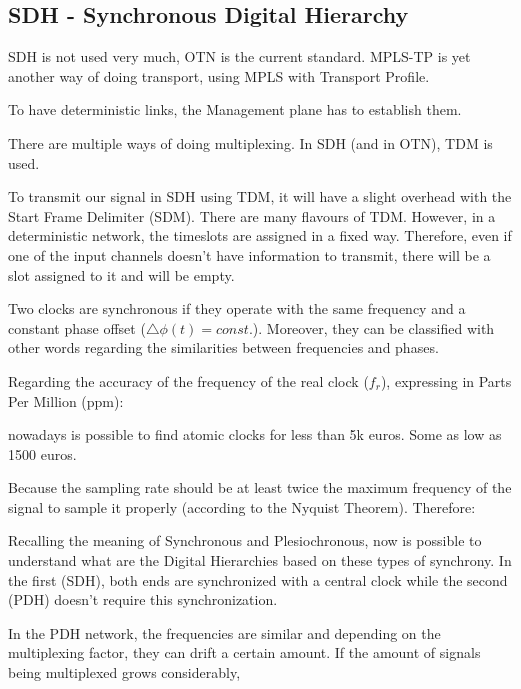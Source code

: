 \subsection{SDH - Synchronous Digital Hierarchy}


SDH is not used very much, OTN is the current standard. MPLS-TP is yet another way of doing transport, using MPLS with Transport Profile.

To have deterministic links, the Management plane has to establish them.

There are multiple ways of doing multiplexing. In SDH (and in OTN), TDM is used.

To transmit our signal in SDH using TDM, it will have a slight overhead with the Start Frame Delimiter (SDM). There are many flavours of TDM. However, in a deterministic network, the timeslots are assigned in a fixed way. Therefore, even if one of the input channels doesn't have information to transmit, there will be a slot assigned to it and will be empty.


Two clocks are synchronous if they operate with the same frequency
and a constant phase offset ($\bigtriangleup \phi(t) = const.$). Moreover, they can be classified with other words regarding the similarities between frequencies and phases.

Regarding the accuracy of the frequency of the real clock ($f_r$), expressing in Parts Per Million (ppm):



 nowadays is possible to find atomic clocks for less than 5k euros. Some as low as 1500 euros.


Because the sampling rate should be at least twice the maximum frequency of the signal to sample it properly (according to the Nyquist Theorem). Therefore:






Recalling the meaning of Synchronous and Plesiochronous, now is possible to understand
what are the Digital Hierarchies based on these types of synchrony. In the first (SDH), both ends are synchronized with a central clock while the second (PDH) doesn't require this synchronization. 


In the PDH network, the frequencies are similar and depending on the multiplexing factor, they can drift a certain amount. If the amount of signals being multiplexed grows considerably, 

